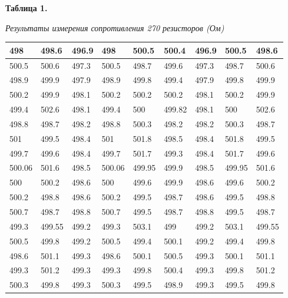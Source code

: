 \documentclass[a4paper,12pt]{article}
\begin{document}
\newpage
               \begin{flushright}
  \textbf{Таблица 1.}
  
  \textit{Результаты измерения сопротивления 270 резисторов (Ом)}
 \end{flushright}
    \begin{table}[!ht]
    \centering
    \begin{tabular}{|l|l|l|l|l|l|l|l|l|}
    \hline
        498 & 498.6 & 496.9 & 498 & 500.5 & 500.4 & 496.9 & 500.5 & 498.6 \\ \hline
        500.5 & 500.6 & 497.3 & 500.5 & 498.7 & 499.6 & 497.3 & 498.7 & 500.6 \\ \hline
        498.9 & 499.9 & 497.9 & 498.9 & 499.8 & 499.4 & 497.9 & 499.8 & 499.9 \\ \hline
        500.2 & 499.9 & 498.1 & 500.2 & 500.2 & 500.2 & 498.1 & 500.2 & 499.9 \\ \hline
        499.4 & 502.6 & 498.1 & 499.4 & 500 & 499.82 & 498.1 & 500 & 502.6 \\ \hline
        498.8 & 498.7 & 498.2 & 498.8 & 500.3 & 498.2 & 498.2 & 500.3 & 498.7 \\ \hline
        501 & 499.5 & 498.4 & 501 & 501.8 & 498.5 & 498.4 & 501.8 & 499.5 \\ \hline
        499.7 & 499.6 & 498.4 & 499.7 & 501.7 & 499.3 & 498.4 & 501.7 & 499.6 \\ \hline
        500.06 & 501.6 & 498.5 & 500.06 & 499.95 & 499.9 & 498.5 & 499.95 & 501.6 \\ \hline
        500 & 500.2 & 498.6 & 500 & 499.6 & 499.9 & 498.6 & 499.6 & 500.2 \\ \hline
        500.2 & 498.8 & 498.6 & 500.2 & 499.5 & 498.7 & 498.6 & 499.5 & 498.8 \\ \hline
        500.7 & 498.7 & 498.8 & 500.7 & 499.5 & 498.7 & 498.8 & 499.5 & 498.7 \\ \hline
        499.3 & 499.55 & 499.2 & 499.3 & 503.1 & 499 & 499.2 & 503.1 & 499.55 \\ \hline
        500.5 & 499.8 & 499.2 & 500.5 & 499.4 & 500.1 & 499.2 & 499.4 & 499.8 \\ \hline
        498.6 & 501.1 & 499.3 & 498.6 & 500.1 & 500.5 & 499.3 & 500.1 & 501.1 \\ \hline
        499.3 & 501.2 & 499.3 & 499.3 & 499.8 & 500.4 & 499.3 & 499.8 & 501.2 \\ \hline
        500.3 & 499.8 & 499.3 & 500.3 & 499.5 & 498.9 & 499.3 & 499.5 & 499.8 \\ \hline

\end{tabular}
\end{table}
\end{document}
